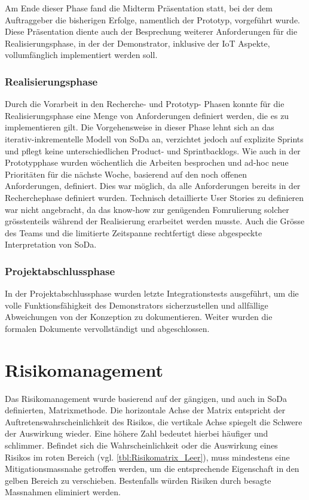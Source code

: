 Am Ende dieser Phase fand die Midterm Präsentation statt, bei der dem Auftraggeber die bisherigen Erfolge, namentlich der Prototyp, vorgeführt wurde. Diese Präsentation diente auch der Besprechung weiterer Anforderungen für die Realisierungsphase, in der der Demonstrator, inklusive der IoT Aspekte, vollumfänglich implementiert werden soll.

\subsubsection{Realisierungsphase}
\label{pm_subsubsec:Realisierungsphase}
Durch die Vorarbeit in den Recherche- und Prototyp- Phasen konnte für die Realisierungsphase eine Menge von Anforderungen definiert werden, die es zu implementieren gilt. Die Vorgehensweise in dieser Phase lehnt sich an das iterativ-inkrementelle Modell von SoDa an, verzichtet jedoch auf explizite Sprints und pflegt keine unterschiedlichen Product- und Sprintbacklogs. Wie auch in der Prototypphase wurden wöchentlich die Arbeiten besprochen und ad-hoc neue Prioritäten für die nächste Woche, basierend auf den noch offenen Anforderungen, definiert. Dies war möglich, da alle Anforderungen bereits in der Recherchephase definiert wurden. Technisch detaillierte User Stories zu definieren war nicht angebracht, da das know-how zur genügenden Fomrulierung solcher grösstenteils während der Realisierung erarbeitet werden musste. Auch die Grösse des Teams und die limitierte Zeitspanne rechtfertigt diese abgespeckte Interpretation von SoDa.

\subsubsection{Projektabschlussphase}
\label{pm_subsubsec:Projektabschlussphase}
In der Projektabschlussphase wurden letzte Integrationstests ausgeführt, um die volle Funktionsfähigkeit des Demonstrators sicherzustellen und allfällige Abweichungen von der Konzeption zu dokumentieren. Weiter wurden die formalen Dokumente vervollständigt und abgeschlossen.

\section{Risikomanagement}
Das Risikomanagement wurde basierend auf der gängigen, und auch in SoDa definierten, Matrixmethode. Die horizontale Achse der Matrix entspricht der Auftretenswahrscheinlichkeit des Risikos, die vertikale Achse spiegelt die Schwere der Auswirkung wieder. Eine höhere Zahl bedeutet hierbei häufiger und schlimmer. Befindet sich die Wahrscheinlichkeit oder die Auswirkung eines Risikos im roten Bereich (vgl. \ref{tbl:Risikomatrix_Leer}), muss mindestens eine Mitigationsmassnahe getroffen werden, um die entsprechende Eigenschaft in den gelben Bereich zu verschieben. Bestenfalls würden Risiken durch besagte Massnahmen eliminiert werden.

